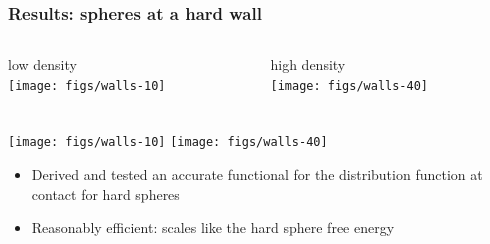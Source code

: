 \begin{frame}
  \frametitle{Results:  spheres at a hard wall}
  \begin{columns}
    \begin{column}{0.5\columnwidth}
      \begin{center}
        low density\\
        \texttt{[image: figs/walls-10]}
      \end{center}
    \end{column}
    \begin{column}{0.5\columnwidth}
      \begin{center}
        high density\\
        \texttt{[image: figs/walls-40]}
      \end{center}
    \end{column}
  \end{columns}
\end{frame}

\begin{frame}
  \frametitle{\conclude}
  \begin{center}
    \texttt{[image: figs/walls-10]}
    \texttt{[image: figs/walls-40]}
  \end{center}
  \begin{itemize}
  \item Derived and tested an accurate functional for the distribution
    function at contact for hard spheres
  \item Reasonably efficient: scales like the hard sphere free energy
  \end{itemize}
\end{frame}
